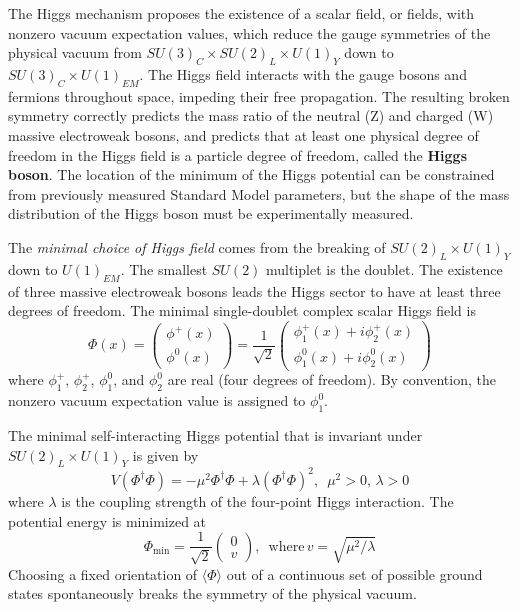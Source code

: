 \documentclass{article}
\begin{document}
The Higgs mechanism proposes the existence of a scalar field, or fields, with nonzero vacuum expectation values, which reduce the gauge symmetries of the physical vacuum from $SU(3)_C \times SU(2)_L \times U(1)_Y$ down to $SU(3)_C \times U(1)_{EM}$. The Higgs field interacts with the gauge bosons and fermions throughout space, impeding their free propagation. The resulting broken symmetry correctly predicts the mass ratio of the neutral (Z) and charged (W) massive electroweak bosons, and predicts that at least one physical degree of freedom in the Higgs field is a particle degree of freedom, called the \textbf{Higgs boson}. The location of the minimum of the Higgs potential can be constrained from previously measured Standard Model parameters, but the shape of the mass distribution of the Higgs boson must be experimentally measured.

The \textit{minimal choice of Higgs field} comes from the breaking of $SU(2)_L \times U(1)_Y$ down to $U(1)_{EM}$. The smallest $SU(2)$ multiplet is the doublet. The existence of three massive electroweak bosons leads the Higgs sector to have at least three degrees of freedom. The minimal single-doublet complex scalar Higgs field is
\begin{equation}
    \Phi(x) = \begin{pmatrix} \phi^+(x) \\ \phi^0(x) \end{pmatrix} 
    = \frac{1}{\sqrt{2}} \begin{pmatrix} \phi_1^+(x) + i\phi_2^+(x) \\ \phi_1^0(x) + i\phi_2^0 (x) \end{pmatrix}
\end{equation}
where $\phi_1^+$, $\phi_2^+$, $\phi_1^0$, and $\phi_2^0$ are real (four degrees of freedom). By convention, the nonzero vacuum expectation value is assigned to $\phi_1^0$.

The minimal self-interacting Higgs potential that is invariant under $SU(2)_L \times U(1)_Y$ is given by
\begin{equation}
    V(\Phi^\dagger \Phi) = -\mu^2 \Phi^\dagger \Phi + \lambda (\Phi^\dagger \Phi)^2, \,\,\, \mu^2 > 0, \, \lambda > 0
\end{equation}
where $\lambda$ is the coupling strength of the four-point Higgs interaction. 
The potential energy is minimized at 
\begin{equation}
    \Phi_{\text{min}} = \frac{1}{\sqrt{2}} \begin{pmatrix} 0 \\ v \end{pmatrix}, \,\,\,\text{where} \, v = \sqrt{\mu^2 / \lambda}
\end{equation}
Choosing a fixed orientation of $\langle \Phi \rangle$ out of a continuous set of possible ground states spontaneously breaks the symmetry of the physical vacuum.
\end{document}
